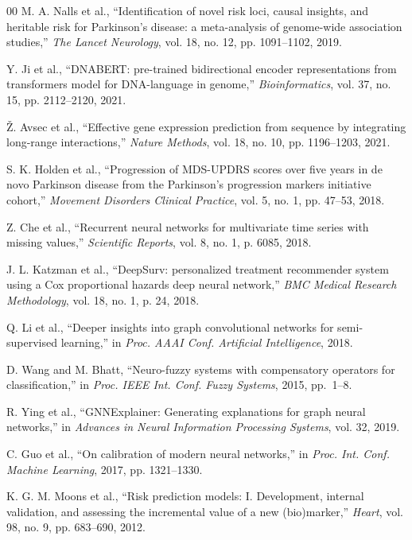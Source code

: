 \documentclass[journal,twoside,web]{ieeecolor}
\begin{document}
\begin{thebibliography}{00}
M. A. Nalls et al., ``Identification of novel risk loci, causal insights, and heritable risk for Parkinson's disease: a meta-analysis of genome-wide association studies,'' \textit{The Lancet Neurology}, vol. 18, no. 12, pp. 1091--1102, 2019.

Y. Ji et al., ``DNABERT: pre-trained bidirectional encoder representations from transformers model for DNA-language in genome,'' \textit{Bioinformatics}, vol. 37, no. 15, pp. 2112--2120, 2021.

\v{Z}. Avsec et al., ``Effective gene expression prediction from sequence by integrating long-range interactions,'' \textit{Nature Methods}, vol. 18, no. 10, pp. 1196--1203, 2021.

S. K. Holden et al., ``Progression of MDS-UPDRS scores over five years in de novo Parkinson disease from the Parkinson's progression markers initiative cohort,'' \textit{Movement Disorders Clinical Practice}, vol. 5, no. 1, pp. 47--53, 2018.

Z. Che et al., ``Recurrent neural networks for multivariate time series with missing values,'' \textit{Scientific Reports}, vol. 8, no. 1, p. 6085, 2018.

J. L. Katzman et al., ``DeepSurv: personalized treatment recommender system using a Cox proportional hazards deep neural network,'' \textit{BMC Medical Research Methodology}, vol. 18, no. 1, p. 24, 2018.

Q. Li et al., ``Deeper insights into graph convolutional networks for semi-supervised learning,'' in \textit{Proc. AAAI Conf. Artificial Intelligence}, 2018.

D. Wang and M. Bhatt, ``Neuro-fuzzy systems with compensatory operators for classification,'' in \textit{Proc. IEEE Int. Conf. Fuzzy Systems}, 2015, pp.~1--8.

R. Ying et al., ``GNNExplainer: Generating explanations for graph neural networks,'' in \textit{Advances in Neural Information Processing Systems}, vol. 32, 2019.

C. Guo et al., ``On calibration of modern neural networks,'' in \textit{Proc. Int. Conf. Machine Learning}, 2017, pp. 1321--1330.

K. G. M. Moons et al., ``Risk prediction models: I. Development, internal validation, and assessing the incremental value of a new (bio)marker,'' \textit{Heart}, vol. 98, no. 9, pp. 683--690, 2012.


\end{thebibliography}
\end{document}
